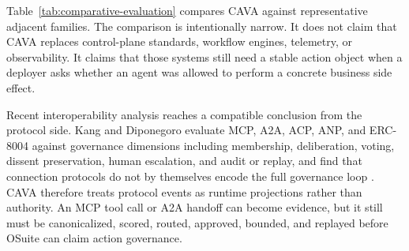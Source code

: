 \documentclass[11pt]{article}
\begin{document}
Table~\ref{tab:comparative-evaluation} compares CAVA against representative adjacent families. The comparison is intentionally narrow. It does not claim that CAVA replaces control-plane standards, workflow engines, telemetry, or observability. It claims that those systems still need a stable action object when a deployer asks whether an agent was allowed to perform a concrete business side effect.

Recent interoperability analysis reaches a compatible conclusion from the protocol side. Kang and Diponegoro evaluate MCP, A2A, ACP, ANP, and ERC-8004 against governance dimensions including membership, deliberation, voting, dissent preservation, human escalation, and audit or replay, and find that connection protocols do not by themselves encode the full governance loop \citep{kangdiponegoro2026governancegaps}. CAVA therefore treats protocol events as runtime projections rather than authority. An MCP tool call or A2A handoff can become evidence, but it still must be canonicalized, scored, routed, approved, bounded, and replayed before OSuite can claim action governance.
\end{document}

